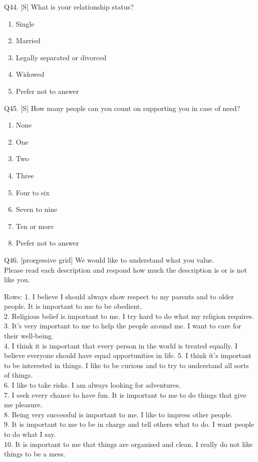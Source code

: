 \documentclass[
  12pt,
  a4paper,
]{article}
\providecommand{\tightlist}{%
  \setlength{\itemsep}{0pt}\setlength{\parskip}{0pt}}
\begin{document}
Q44. {[}S{]} What is your relationship status?

\begin{enumerate}
\def\labelenumi{\arabic{enumi}.}
\tightlist
\item
  Single
\item
  Married
\item
  Legally separated or divorced
\item
  Widowed
\item
  Prefer not to answer
\end{enumerate}

Q45. {[}S{]} How many people can you count on supporting you in case of need?

\begin{enumerate}
\def\labelenumi{\arabic{enumi}.}
\tightlist
\item
  None
\item
  One\\
\item
  Two
\item
  Three
\item
  Four to six
\item
  Seven to nine
\item
  Ten or more
\item
  Prefer not to answer
\end{enumerate}

Q46. {[}prorgessive grid{]} We would like to understand what you value.\\
Please read each description and respond how much the description is or is not like you.\,

Rows:
1. I believe I should always show respect to my parents and to older people. It is important to me to be obedient. \\
2. Religious belief is important to me. I try hard to do what my religion requires. \\
3. It's very important to me to help the people around me. I want to care for their well-being. \\
4. I think it is important that every person in the world is treated equally. I believe everyone should have equal opportunities in life.
5. I think it's important to be interested in things. I like to be curious and to try to understand all sorts of things. \\
6. I like to take risks. I am always looking for adventures. \\
7. I seek every chance to have fun. It is important to me to do things that give me pleasure. \\
8. Being very successful is important to me. I like to impress other people. \\
9. It is important to me to be in charge and tell others what to do. I want people to do what I say. \\
10. It is important to me that things are organised and clean. I really do not like things to be a mess.
\end{document}
